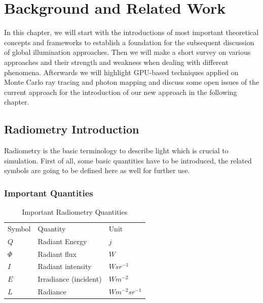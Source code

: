 \chapter{Background and Related Work}

In this chapter, we will start with the introductions of most important theoretical concepts and frameworks to establish a foundation for the subsequent discussion of global illumination approaches. Then we will make a short survey on various approaches and their strength and weakness when dealing with different phenomena. Afterwards we will highlight GPU-based techniques applied on Monte Carlo ray tracing and photon mapping and discuss some open issues of the current approach for the introduction of our new approach in the following chapter. 



\section{Radiometry Introduction}
Radiometry is the basic terminology to describe light which is crucial to simulation. First of all, some basic quantities have to be introduced, the related symbols are going to be defined here as well for further use.

\subsection{Important Quantities} 

\begin{table}[ht]
\begin{center}
	
	\renewcommand{\arraystretch}{1.2}
	\begin{tabular}{ | l | l | l |}     	
	\hline 

	Symbol & Quantity & Unit \\
	\cline{1-3}

	\(Q\) 			& 		Radiant Energy 				& 		\(j\) \\ 
	\(\Phi\) 			& 		Radiant flux 					& 		\(W\) \\ 
	\(I\) 			& 		Radiant intensity 				& 		\(W sr^{-1}\) \\
	\(E\)			&		Irradiance (incident) 			&		\(W m^{-2}\) \\  
	\(L\)			&		Radiance						&		\(W m^{-2} sr^{-1}\) \\ 
	
	\hline

	\end{tabular}
\end{center} 
\caption{Important Radiometry Quantities}
\label{tab:radiometry_quantities}
\end{table}


